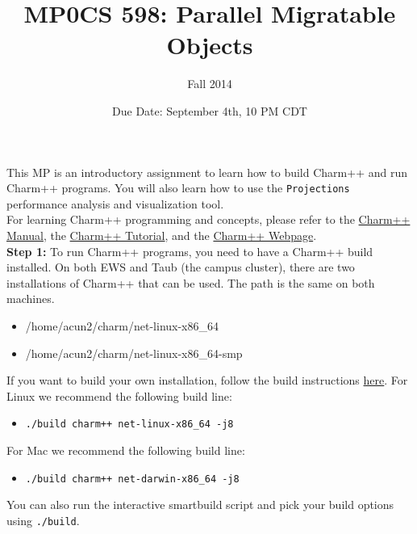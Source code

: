 \documentclass{article}
\title{MP0}
\title{CS 598: Parallel Migratable Objects}
\author{Fall 2014}
\date{Due Date: September 4th, 10 PM CDT}
\begin{document}
\maketitle

This MP is an introductory assignment to learn how to build Charm++ and run
Charm++ programs. You will also learn how to use the \texttt{Projections}
performance analysis and visualization tool. \\

For learning Charm++ programming and concepts, please refer to the
\href{http://charm.cs.illinois.edu/manuals/html/charm++/}{Charm++ Manual},
the \href{http://charm.cs.illinois.edu/tutorial/}{Charm++ Tutorial},
and the \href{http://charmplusplus.org/}{Charm++ Webpage}.\\

\textbf{Step 1:} To run Charm++ programs, you need to have a Charm++ build installed.
On both EWS and Taub (the campus cluster), there are two installations of Charm++ that can be used.
The path is the same on both machines.
\begin{itemize}
\item /home/acun2/charm/net-linux-x86\_64
\item /home/acun2/charm/net-linux-x86\_64-smp\\
\end{itemize}

If you want to build your own installation, follow the build
instructions \href{http://charm.cs.illinois.edu/manuals/html/charm++/A.html}{here}.
For Linux we recommend the following build line:
\begin{itemize}
\item \texttt{./build charm++ net-linux-x86\_64 -j8}
\end{itemize}
For Mac we recommend the following build line:
\begin{itemize}
\item \texttt{./build charm++ net-darwin-x86\_64 -j8}
\end{itemize}
You can also run the interactive smartbuild script and pick your build options using \texttt{./build}.\\
\end{document}
